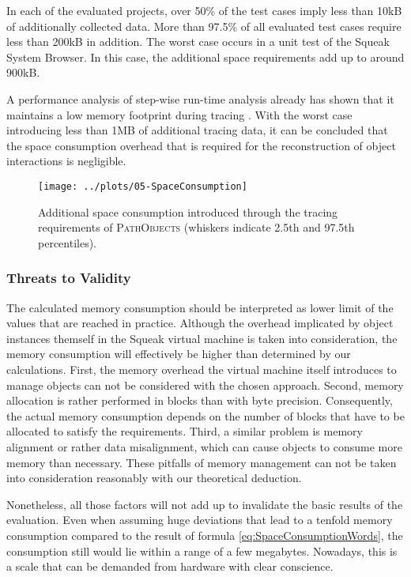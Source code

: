 In each of the evaluated projects, over 50\% of the test cases imply less than 10kB of additionally collected data.
More than 97.5\% of all evaluated test cases require less than 200kB in addition.
The worst case occurs in a unit test of the Squeak System Browser.
In this case, the additional space requirements add up to around 900kB.

A performance analysis of step-wise run-time analysis already has shown that it maintains a low memory footprint during tracing \cite{perscheid_immediacy_2010}.
With the worst case introducing less than 1MB of additional tracing data, it can be concluded that the space consumption overhead that is required for the reconstruction of object interactions is negligible.

\begin{figure}[tb!]
	\centering
	\texttt{[image: ../plots/05-SpaceConsumption]}
	\caption[Space Requirements Introduced Through \textsc{PathObjects}]{Additional space consumption introduced through the tracing requirements of \textsc{PathObjects} (whiskers indicate 2.5th and 97.5th percentiles).}
	\label{fig:DiscussionSpace}
\end{figure}

\subsubsection{Threats to Validity}
The calculated memory consumption should be interpreted as lower limit of the values that are reached in practice.
Although the overhead implicated by object instances themself in the Squeak virtual machine is taken into consideration, the memory consumption will effectively be higher than determined by our calculations.
First, the memory overhead the virtual machine itself introduces to manage objects can not be considered with the chosen approach.
Second, memory allocation is rather performed in blocks than with byte precision.
Consequently, the actual memory consumption depends on the number of blocks that have to be allocated to satisfy the requirements.
Third, a similar problem is memory alignment or rather data misalignment, which can cause objects to consume more memory than necessary.
These pitfalls of memory management can not be taken into consideration reasonably with our theoretical deduction.

Nonetheless, all those factors will not add up to invalidate the basic results of the evaluation.
Even when assuming huge deviations that lead to a tenfold memory consumption compared to the result of formula \ref{eq:SpaceConsumptionWords}, the consumption still would lie within a range of a few megabytes.
Nowadays, this is a scale that can be demanded from hardware with clear conscience.

